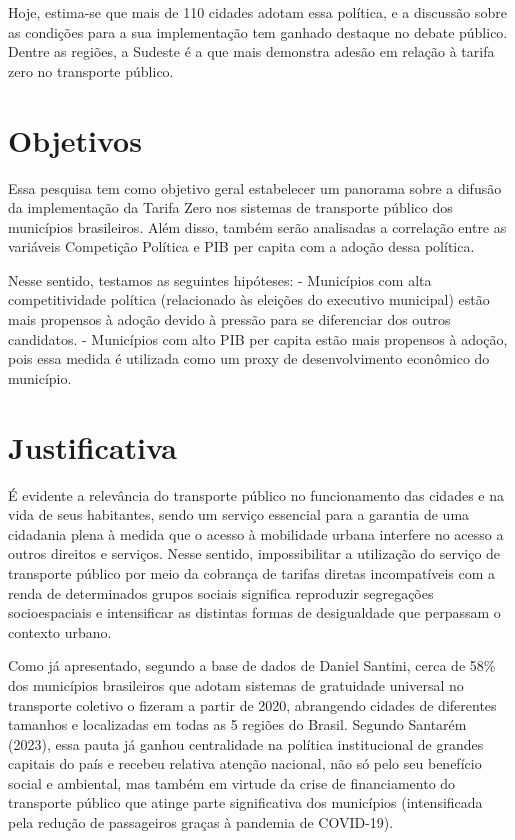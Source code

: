 \documentclass[
]{article}
\begin{document}
Hoje, estima-se que mais de 110 cidades adotam essa política, e a
discussão sobre as condições para a sua implementação tem ganhado
destaque no debate público. Dentre as regiões, a Sudeste é a que mais
demonstra adesão em relação à tarifa zero no transporte público.

\section{Objetivos}\label{objetivos}

Essa pesquisa tem como objetivo geral estabelecer um panorama sobre a
difusão da implementação da Tarifa Zero nos sistemas de transporte
público dos municípios brasileiros. Além disso, também serão analisadas
a correlação entre as variáveis Competição Política e PIB per capita com
a adoção dessa política.

Nesse sentido, testamos as seguintes hipóteses: - Municípios com alta
competitividade política (relacionado às eleições do executivo
municipal) estão mais propensos à adoção devido à pressão para se
diferenciar dos outros candidatos. - Municípios com alto PIB per capita
estão mais propensos à adoção, pois essa medida é utilizada como um
proxy de desenvolvimento econômico do município.

\section{Justificativa}\label{justificativa}

É evidente a relevância do transporte público no funcionamento das
cidades e na vida de seus habitantes, sendo um serviço essencial para a
garantia de uma cidadania plena à medida que o acesso à mobilidade
urbana interfere no acesso a outros direitos e serviços. Nesse sentido,
impossibilitar a utilização do serviço de transporte público por meio da
cobrança de tarifas diretas incompatíveis com a renda de determinados
grupos sociais significa reproduzir segregações socioespaciais e
intensificar as distintas formas de desigualdade que perpassam o
contexto urbano.

Como já apresentado, segundo a base de dados de Daniel Santini, cerca de
58\% dos municípios brasileiros que adotam sistemas de gratuidade
universal no transporte coletivo o fizeram a partir de 2020, abrangendo
cidades de diferentes tamanhos e localizadas em todas as 5 regiões do
Brasil. Segundo Santarém (2023), essa pauta já ganhou centralidade na
política institucional de grandes capitais do país e recebeu relativa
atenção nacional, não só pelo seu benefício social e ambiental, mas
também em virtude da crise de financiamento do transporte público que
atinge parte significativa dos municípios (intensificada pela redução de
passageiros graças à pandemia de COVID-19).
\end{document}
